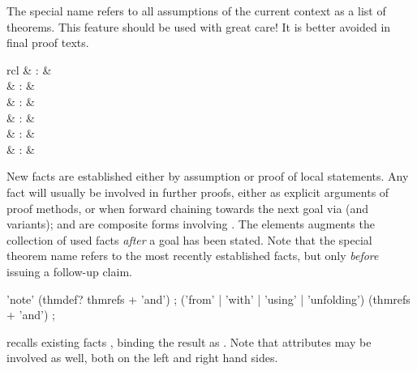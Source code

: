 \begin{isabellebody}
\begin{isamarkuptext}
  The special name  refers to all assumptions of the
  current context as a list of theorems.  This feature should be used
  with great care!  It is better avoided in final proof texts.%
\end{isamarkuptext}%
\isamarkuptrue%
%
\isamarkuptrue%
%
\begin{isamarkuptext}%
\begin{matharray}{rcl}
     & : &  \\
     & : &  \\
     & : &  \\
     & : &  \\
     & : &  \\
     & : &  \\
  \end{matharray}

  New facts are established either by assumption or proof of local
  statements.  Any fact will usually be involved in further proofs,
  either as explicit arguments of proof methods, or when forward
  chaining towards the next goal via  (and variants);
   and  are composite forms
  involving .  The  elements
  augments the collection of used facts \emph{after} a goal has been
  stated.  Note that the special theorem name  refers
  to the most recently established facts, but only \emph{before}
  issuing a follow-up claim.

  \begin{rail}
    'note' (thmdef? thmrefs + 'and')
    ;
    ('from' | 'with' | 'using' | 'unfolding') (thmrefs + 'and')
    ;
  \end{rail}

  \begin{descr}

  \item [\isa{\isacommand{note}}~\isa{a\ {\isacharequal}\ b\isactrlsub {\isadigit{1}}\ {\isasymdots}\ b\isactrlsub n}]
  recalls existing facts , binding
  the result as .  Note that attributes may be involved as
  well, both on the left and right hand sides.


\end{descr}
\end{isamarkuptext}
\end{isabellebody}
